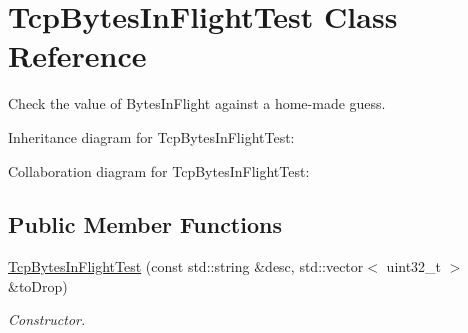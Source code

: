 \hypertarget{classTcpBytesInFlightTest}{}\section{Tcp\+Bytes\+In\+Flight\+Test Class Reference}
\label{classTcpBytesInFlightTest}


Check the value of Bytes\+In\+Flight against a home-\/made guess.  




Inheritance diagram for Tcp\+Bytes\+In\+Flight\+Test\+:


Collaboration diagram for Tcp\+Bytes\+In\+Flight\+Test\+:
\subsection*{Public Member Functions}
\begin{DoxyCompactItemize}
\item 
\hyperlink{classTcpBytesInFlightTest_a99631410cdfe9e356ca02d382e88ad95}{Tcp\+Bytes\+In\+Flight\+Test} (const std\+::string \&desc, std\+::vector$<$ uint32\+\_\+t $>$ \&to\+Drop)
\begin{DoxyCompactList}\small\item\em Constructor. \end{DoxyCompactList}\end{DoxyCompactItemize}
